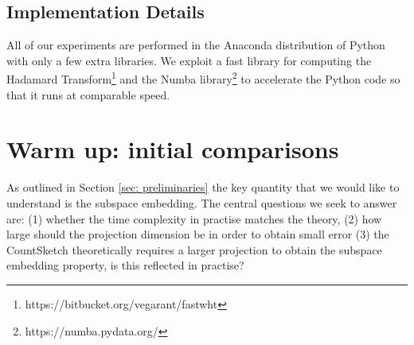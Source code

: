 \documentclass[twoside]{article}
\theoremstyle{definition}\newtheorem{thm}{Theorem}[section]
\theoremstyle{definition}\newtheorem{mydef}[thm]{Definition}
\theoremstyle{definition}\newtheorem{rem}[thm]{Remark}
\theoremstyle{definition}\newtheorem{prop}[thm]{Proposition}
\theoremstyle{definition}\newtheorem{example}[thm]{Example}
\theoremstyle{definition}\newtheorem{claim}[thm]{Claim}
\theoremstyle{definition}\newtheorem{Qu}[thm]{Question}
\theoremstyle{definition}\newtheorem{Lemma}[thm]{Lemma}
\theoremstyle{definition}\newtheorem{Cor}[thm]{Corollary}
\theoremstyle{definition}\newtheorem{Fact}[]{Fact}
\begin{document}
\subsection{Implementation Details}

All of our experiments are performed in the Anaconda distribution of Python
with only a few extra libraries.
We exploit a fast library for computing the Hadamard
Transform\footnote{https://bitbucket.org/vegarant/fastwht} and the Numba
library\footnote{https://numba.pydata.org/} to accelerate the Python code
so that it runs at comparable speed.



\section{Warm up: initial comparisons}

As outlined in Section \ref{sec: preliminaries} the key quantity that we would
like to understand is the subspace embedding.
The central questions we seek to answer are: (1) whether the time complexity
in practise matches the theory, (2) how large should the projection
dimension be in order to obtain small error (3) the CountSketch
theoretically requires a larger projection to obtain the subspace embedding
property, is this reflected in practise?





\end{document}
